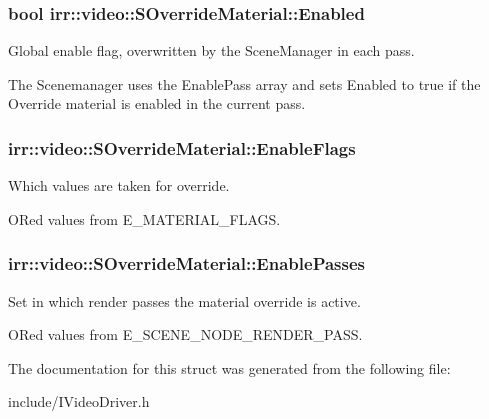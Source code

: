 \subsubsection[{\texorpdfstring{Enabled}{Enabled}}]{\setlength{\rightskip}{0pt plus 5cm}bool irr\+::video\+::\+S\+Override\+Material\+::\+Enabled}\hypertarget{structirr_1_1video_1_1SOverrideMaterial_ab2606fe0a478e59ec7bcd37dd0f4125a}{}\label{structirr_1_1video_1_1SOverrideMaterial_ab2606fe0a478e59ec7bcd37dd0f4125a}


Global enable flag, overwritten by the Scene\+Manager in each pass. 

The Scenemanager uses the Enable\+Pass array and sets Enabled to true if the Override material is enabled in the current pass. 
\subsubsection[{\texorpdfstring{Enable\+Flags}{EnableFlags}}]{ irr\+::video\+::\+S\+Override\+Material\+::\+Enable\+Flags}\hypertarget{structirr_1_1video_1_1SOverrideMaterial_a58b20260b94f880ab4680e08c098e2f4}{}\label{structirr_1_1video_1_1SOverrideMaterial_a58b20260b94f880ab4680e08c098e2f4}


Which values are taken for override. 

OR\textquotesingle{}ed values from E\+\_\+\+M\+A\+T\+E\+R\+I\+A\+L\+\_\+\+F\+L\+A\+GS. 
\subsubsection[{\texorpdfstring{Enable\+Passes}{EnablePasses}}]{ irr\+::video\+::\+S\+Override\+Material\+::\+Enable\+Passes}\hypertarget{structirr_1_1video_1_1SOverrideMaterial_af809f3d1a4408b8369ee94295cf01e4a}{}\label{structirr_1_1video_1_1SOverrideMaterial_af809f3d1a4408b8369ee94295cf01e4a}


Set in which render passes the material override is active. 

OR\textquotesingle{}ed values from E\+\_\+\+S\+C\+E\+N\+E\+\_\+\+N\+O\+D\+E\+\_\+\+R\+E\+N\+D\+E\+R\+\_\+\+P\+A\+SS. 

The documentation for this struct was generated from the following file\+:\begin{DoxyCompactItemize}
\item 
include/I\+Video\+Driver.\+h\end{DoxyCompactItemize}
